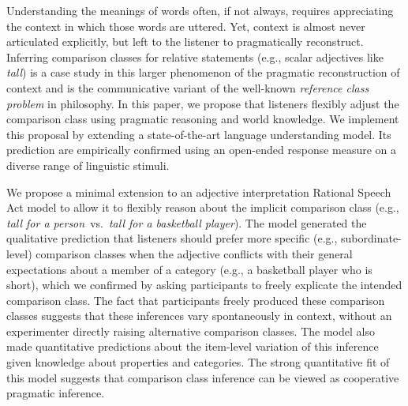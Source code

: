 \documentclass[doc, floatsintext]{apa6}
\newcommand{\red}[1]{\textcolor{Red}{#1}}
\begin{document}






Understanding the meanings of words often, if not always, requires appreciating the context in which those words are uttered.
Yet, context is almost never articulated explicitly, but left to the listener to pragmatically reconstruct.
Inferring comparison classes for relative statements (e.g., scalar adjectives like \emph{tall}) is a case study in this larger phenomenon of the pragmatic reconstruction of context and is the communicative variant of the well-known \emph{reference class problem} in philosophy.
In this paper, we propose that listeners flexibly adjust the comparison class using pragmatic reasoning and world knowledge. 
We implement this proposal by extending a state-of-the-art language understanding model. Its prediction are empirically confirmed using an open-ended response measure on a diverse range of linguistic stimuli.

We propose a minimal extension to an adjective interpretation Rational Speech Act model to allow it to flexibly reason about the implicit comparison class (e.g., \emph{tall for a person}~vs.~\emph{tall for a basketball player}).
The model generated the qualitative prediction that listeners should prefer more specific (e.g., subordinate-level) comparison classes when the adjective conflicts with their general expectations about a member of a category (e.g., a basketball player who is short), which we confirmed by asking participants to freely explicate the intended comparison class.
The fact that participants freely produced these comparison classes suggests that these inferences vary spontaneously in context, without an experimenter directly raising alternative comparison classes.  
The model also made quantitative predictions about the item-level variation of this inference given knowledge about properties and categories.
The strong quantitative fit of this model suggests that comparison class inference can be viewed as cooperative pragmatic inference.
\end{document}

